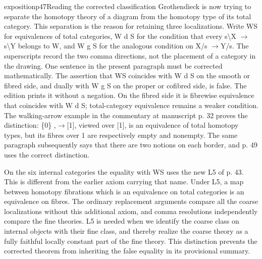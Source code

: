\begin{dcomment}{exposition}{p47}{Reading the corrected classification}
Grothendieck is now trying to separate the homotopy theory of a diagram from the homotopy type of its total category. This separation is the reason for retaining three localizations. Write WS for equivalences of total categories, W d S for the condition that every s\textbackslash{}X \ensuremath{\to}s\textbackslash{}Y belongs to W, and W g S for the analogous condition on X/s \ensuremath{\to}Y/s. The superscripts record the two comma directions, not the placement of a category in the drawing. One sentence in the present paragraph must be corrected mathematically. The assertion that WS coincides with W d S on the smooth or fibred side, and dually with W g S on the proper or cofibred side, is false. The edition prints it without a negation. On the fibred side it is fibrewise equivalence that coincides with W d S; total-category equivalence remains a weaker condition. The walking-arrow example in the commentary at manuscript p. 32 proves the distinction: \{0\} ,\ensuremath{\to}[1], viewed over [1], is an equivalence of total homotopy types, but its fibres over 1 are respectively empty and nonempty. The same paragraph subsequently says that there are two notions on each border, and p. 49 uses the correct distinction.

On the six internal categories the equality with WS uses the new L5 of p. 43. This is different from the earlier axiom carrying that name. Under L5, a map between homotopy fibrations which is an equivalence on total categories is an equivalence on fibres. The ordinary replacement arguments compare all the coarse localizations without this additional axiom, and comma resolutions independently compare the fine theories. L5 is needed when we identify the coarse class on internal objects with their fine class, and thereby realize the coarse theory as a fully faithful locally constant part of the fine theory. This distinction prevents the corrected theorem from inheriting the false equality in its provisional summary.

\end{dcomment}

